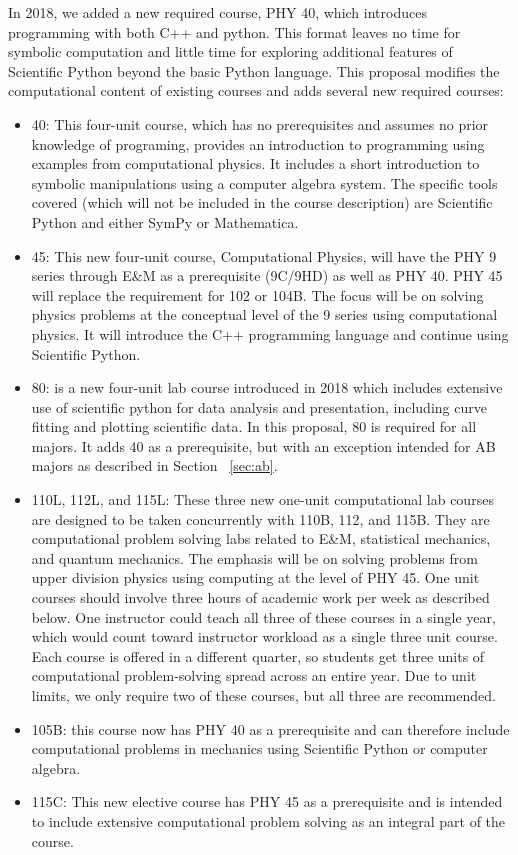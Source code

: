 \documentclass[12pt]{article}
\begin{document}
In 2018, we added a new required course, PHY 40, which introduces
programming with both C++ and python.  This format leaves no time for
symbolic computation and little time for exploring additional features
of Scientific Python beyond the basic Python language.  This proposal
modifies the computational content of existing courses and adds
several new required courses:
\begin{itemize}
\item 40: This four-unit course, which has no prerequisites and
  assumes no prior knowledge of programing, provides an introduction
  to programming using examples from computational physics.  It
  includes a short introduction to symbolic manipulations using a
  computer algebra system.  The specific tools covered (which will not
  be included in the course description) are Scientific Python and
  either SymPy or Mathematica.

\item 45: This new four-unit course, Computational Physics, will have
  the PHY 9 series through E\&M as a prerequisite (9C/9HD) as well as
  PHY 40.  PHY 45 will replace the requirement for 102 or 104B.  The
  focus will be on solving physics problems at the conceptual level of
  the 9 series using computational physics.  It will introduce the C++
  programming language and continue using Scientific Python.
  
\item 80: is a new four-unit lab course introduced in 2018 which
  includes extensive use of scientific python for data analysis and
  presentation, including curve fitting and plotting scientific data.
  In this proposal, 80 is required for all majors.  It adds 40 as a
  prerequisite, but with an exception intended for AB majors as described
  in Section ~\ref{sec:ab}.

\item 110L, 112L, and 115L: These three new one-unit computational lab
  courses are designed to be taken concurrently with 110B, 112, and
  115B. They are computational problem solving labs related to E\&M,
  statistical mechanics, and quantum mechanics.  The emphasis will be
  on solving problems from upper division physics using computing at
  the level of PHY 45.  One unit courses should involve three hours of
  academic work per week as described below.  One instructor could
  teach all three of these courses in a single year, which would count
  toward instructor workload as a single three unit course.  Each course
  is offered in a different quarter, so students get three units of
  computational problem-solving spread across an entire year.  Due to
  unit limits, we only require two of these courses, but all three are
  recommended.

\item 105B: this course now has PHY 40 as a prerequisite and can
  therefore include computational problems in mechanics using
  Scientific Python or computer algebra.

\item 115C: This new elective course has PHY 45 as a prerequisite and
  is intended to include extensive computational problem solving as an
  integral part of the course.
  
\end{itemize}
\end{document}
